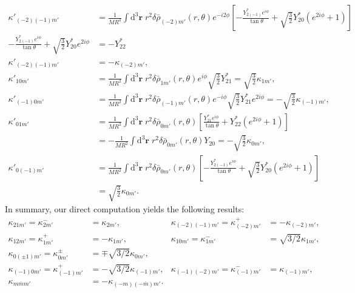 \documentclass[12pt]{article}
\newcommand*{\bm}[1]{\boldsymbol{\mathbf{#1}}}
\newcommand*{\p}[1]{\left(#1\right)}
\newcommand*{\s}[1]{\left[#1\right]}
\begin{document}
\begin{align}
    \kappa'_{(-2)(-1)m'}
        &=
            \frac{1}{MR^2}
            \int\limits\mathrm{d}^3 \bm{r}\;
            r^2
            \delta \bar{\rho}_{(-2)m'}(r, \theta)
            e^{-i2\phi}
            \s{-\frac{Y_{2(-1)}^* e^{i\phi}}{\tan\theta}
                + \sqrt{\frac{3}{2}}Y_{20}^* \p{e^{2i\phi} + 1}}\nonumber\\
    -\frac{Y_{2(-1)}^* e^{i\phi}}{\tan\theta}
            + \sqrt{\frac{3}{2}}Y_{20}^* e^{2i\phi}
        &= - Y_{22}^*\nonumber\\
    \kappa'_{(-2)(-1)m'} &= -\kappa_{(-2)m'},\\
    \kappa'_{10m'}
        &=
            \frac{1}{MR^2}
            \int\limits\mathrm{d}^3 \bm{r}\;
            r^2
            \delta \bar{\rho}_{1m'}(r, \theta)
            e^{i\phi}
            \sqrt{\frac{3}{2}}Y_{21}^* = \sqrt{\frac{3}{2}}\kappa_{1m'},\\
    \kappa'_{(-1)0m'}
        &=
            \frac{1}{MR^2}
            \int\limits\mathrm{d}^3 \bm{r}\;
            r^2
            \delta \bar{\rho}_{(-1)m'}(r, \theta)
            e^{-i\phi}
            \sqrt{\frac{3}{2}}Y_{21}^*e^{2i\phi}
                = -\sqrt{\frac{3}{2}} \kappa_{(-1)m'},\\
    \kappa'_{01m'}
        &=
            \frac{1}{MR^2}
            \int\limits\mathrm{d}^3 \bm{r}\;
            r^2
            \delta \bar{\rho}_{0m'}(r, \theta)
            \s{\frac{Y_{21}^* e^{i\phi}}{\tan\theta}
                + Y_{22}^* \p{e^{2i\phi} + 1}}\nonumber\\
        &=
            -\frac{1}{MR^2}
            \int\limits\mathrm{d}^3 \bm{r}\;
            r^2
            \delta \bar{\rho}_{0m'}(r, \theta)
            Y_{20} = -\sqrt{\frac{3}{2}}\kappa_{0m'},\\
    \kappa'_{0(-1)m'}
        &=
            \frac{1}{MR^2}
            \int\limits\mathrm{d}^3 \bm{r}\;
            r^2
            \delta \bar{\rho}_{0m'}(r, \theta)
            \s{-\frac{Y_{2(-1)}^* e^{i\phi}}{\tan\theta}
                + \sqrt{\frac{3}{2}}Y_{20}^* \p{e^{2i\phi} + 1}}\nonumber\\
        &= \sqrt{\frac{3}{2}}\kappa_{0m'}.
\end{align}
In summary, our direct computation yields the following results:
\begin{align}
    \kappa_{21m'} = \kappa_{2m'}^- &= \kappa_{2m'}, &
    \kappa_{(-2)(-1)m'} = \kappa_{(-2)m'}^+ &= -\kappa_{(-2)m'}, \nonumber\\
    \kappa_{12m'} = \kappa_{1m'}^+ &= -\kappa_{1m'}, &
    \kappa_{10m'} = \kappa_{1m'}^- &= \sqrt{3/2}\kappa_{1m'}, \nonumber\\
    \kappa_{0(\pm 1)m'} = \kappa_{0m'}^{\pm} &= \mp \sqrt{3/2}\kappa_{0m'}, \nonumber\\
    \kappa_{(-1)0m'} = \kappa_{(-1)m'}^+ &= -\sqrt{3/2}\kappa_{(-1)m'}, &
    \kappa_{(-1)(-2)m'} = \kappa_{(-1)m'}^- &= \kappa_{(-1)m'},\\
    \kappa_{m\bar{m}m'} &= -\kappa_{(-m)(-\bar{m})m'}.
\end{align}
\end{document}

